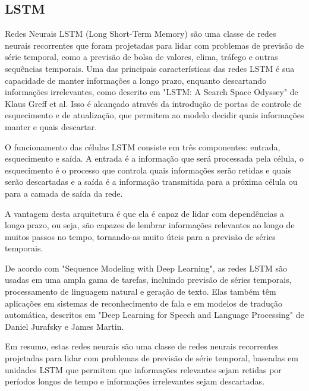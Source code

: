 \subsection{LSTM}

Redes Neurais LSTM (Long Short-Term Memory) são uma classe de redes neurais recorrentes que foram projetadas para lidar com problemas de previsão de série temporal, como a previsão de bolsa de valores, clima, tráfego e outras sequências temporais. Uma das principais características das redes LSTM é sua capacidade de manter informações a longo prazo, enquanto descartando informações irrelevantes, como descrito em "LSTM: A Search Space Odyssey" de Klaus Greff et al. Isso é alcançado através da introdução de portas de controle de esquecimento e de atualização, que permitem ao modelo decidir quais informações manter e quais descartar.

O funcionamento das células LSTM consiste em três componentes: entrada, esquecimento e saída. A entrada é a informação que será processada pela célula, o esquecimento é o processo que controla quais informações serão retidas e quais serão descartadas e a saída é a informação transmitida para a próxima célula ou para a camada de saída da rede.

A vantagem desta arquitetura é que ela é capaz de lidar com dependências a longo prazo, ou seja, são capazes de lembrar informações relevantes ao longo de muitos passos no tempo, tornando-as muito úteis para a previsão de séries temporais.

De acordo com "Sequence Modeling with Deep Learning", as redes LSTM são usadas em uma ampla gama de tarefas, incluindo previsão de séries temporais, processamento de linguagem natural e geração de texto. Elas também têm aplicações em sistemas de reconhecimento de fala e em modelos de tradução automática, descritos em "Deep Learning for Speech and Language Processing" de Daniel Jurafsky e James Martin.

Em resumo, estas redes neurais são uma classe de redes neurais recorrentes projetadas para lidar com problemas de previsão de série temporal, baseadas em unidades LSTM que permitem que informações relevantes sejam retidas por períodos longos de tempo e informações irrelevantes sejam descartadas.




